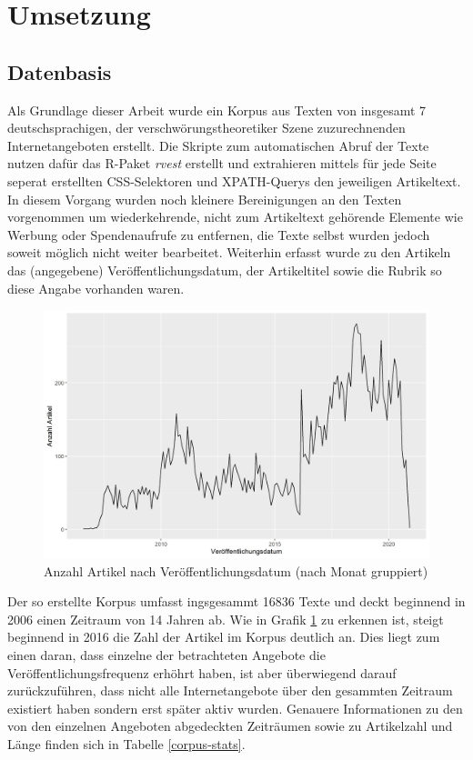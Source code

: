 \section{Umsetzung}

\subsection{Datenbasis}

Als Grundlage dieser Arbeit wurde ein Korpus aus Texten von insgesamt 7 deutschsprachigen, der verschwörungstheoretiker Szene zuzurechnenden Internetangeboten erstellt.
Die Skripte zum automatischen Abruf der Texte nutzen dafür das R-Paket \textit{rvest} \parencite{rvest} erstellt und extrahieren mittels für jede Seite seperat erstellten CSS-Selektoren und XPATH-Querys den jeweiligen Artikeltext. 
In diesem Vorgang wurden noch kleinere Bereinigungen an den Texten vorgenommen um wiederkehrende, nicht zum Artikeltext gehörende Elemente wie Werbung oder Spendenaufrufe zu entfernen, die Texte selbst wurden jedoch soweit möglich nicht weiter bearbeitet.
Weiterhin erfasst wurde zu den Artikeln das (angegebene) Veröffentlichungsdatum, der Artikeltitel sowie die Rubrik so diese Angabe vorhanden waren.

\begin{figure}[h]
    \centering
    \includegraphics[scale=0.45]{graphics/cons_freq_time.jpg}
    \caption{Anzahl Artikel nach Veröffentlichungsdatum (nach Monat gruppiert)}
    \label{article-frequency}
\end{figure}

Der so erstellte Korpus umfasst ingsgesammt 16836 Texte und deckt beginnend in 2006 einen Zeitraum von 14 Jahren ab.
Wie in Grafik \ref{article-frequency} zu erkennen ist, steigt beginnend in 2016 die Zahl der Artikel im Korpus deutlich an.
Dies liegt zum einen daran, dass einzelne der betrachteten Angebote die Veröffentlichungsfrequenz erhöhrt haben, ist aber überwiegend darauf zurückzuführen, dass nicht alle Internetangebote über den gesammten Zeitraum existiert haben sondern erst später aktiv wurden.
Genauere Informationen zu den von den einzelnen Angeboten abgedeckten Zeiträumen sowie zu Artikelzahl und Länge finden sich in Tabelle \ref{corpus-stats}.

